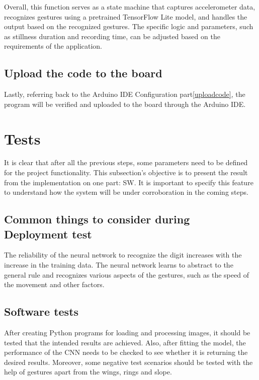 		Overall, this function serves as a state machine that captures accelerometer data, recognizes gestures using a pretrained TensorFlow Lite model, and handles the output based on the recognized gestures. The specific logic and parameters, such as stillness duration and recording time, can be adjusted based on the requirements of the application.
		
		\subsection{Upload the code to the board}
		Lastly, referring back to the Arduino IDE Configuration part\ref{uploadcode}, the program will be verified and uploaded to the board through the Arduino IDE. 
		
		\section{Tests}
		It is clear that after all the previous steps, some parameters need to be defined for the project functionality. This subsection’s objective is to present the result from the implementation on one part: SW. It is important to specify this feature to understand how the system will be under corroboration in the coming steps.
		
		\subsection{Common things to consider during Deployment test}
		The reliability of the neural network to recognize the digit increases with the increase in the training data. The neural network learns to abstract to the general rule and recognizes various aspects of the gestures, such as the speed of the movement and other factors.
		
		\subsection{Software tests}
		After creating Python programs for loading and processing images,
		it should be tested that the intended results are achieved. Also, after fitting the model, the performance of the CNN needs to be checked to see whether it is returning the desired results. Moreover, some negative test scenarios should be tested with the help of gestures apart from the wings, rings and slope.
		
